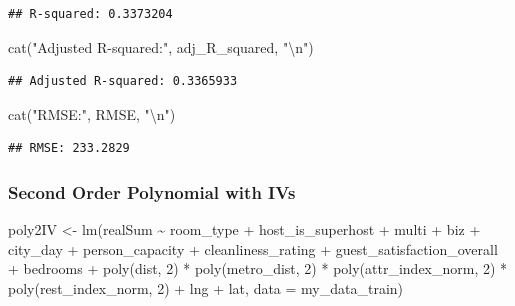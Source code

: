 \documentclass[
]{article}
\newenvironment{Shaded}{\begin{snugshade}}{\end{snugshade}}
\newcommand{\AttributeTok}[1]{\textcolor[rgb]{0.77,0.63,0.00}{#1}}
\newcommand{\DecValTok}[1]{\textcolor[rgb]{0.00,0.00,0.81}{#1}}
\newcommand{\FunctionTok}[1]{\textcolor[rgb]{0.00,0.00,0.00}{#1}}
\newcommand{\NormalTok}[1]{#1}
\newcommand{\OtherTok}[1]{\textcolor[rgb]{0.56,0.35,0.01}{#1}}
\newcommand{\SpecialCharTok}[1]{\textcolor[rgb]{0.00,0.00,0.00}{#1}}
\newcommand{\StringTok}[1]{\textcolor[rgb]{0.31,0.60,0.02}{#1}}
\begin{document}
\begin{verbatim}
## R-squared: 0.3373204
\end{verbatim}

\begin{Shaded}
\begin{Highlighting}[]
\FunctionTok{cat}\NormalTok{(}\StringTok{"Adjusted R{-}squared:"}\NormalTok{, adj\_R\_squared, }\StringTok{"}\SpecialCharTok{\textbackslash{}n}\StringTok{"}\NormalTok{)}
\end{Highlighting}
\end{Shaded}

\begin{verbatim}
## Adjusted R-squared: 0.3365933
\end{verbatim}

\begin{Shaded}
\begin{Highlighting}[]
\FunctionTok{cat}\NormalTok{(}\StringTok{"RMSE:"}\NormalTok{, RMSE, }\StringTok{"}\SpecialCharTok{\textbackslash{}n}\StringTok{"}\NormalTok{)}
\end{Highlighting}
\end{Shaded}

\begin{verbatim}
## RMSE: 233.2829
\end{verbatim}

\hypertarget{second-order-polynomial-with-ivs}{%
\subsubsection{Second Order Polynomial with
IVs}\label{second-order-polynomial-with-ivs}}

\begin{Shaded}
\begin{Highlighting}[]
\NormalTok{poly2IV }\OtherTok{\textless{}{-}} \FunctionTok{lm}\NormalTok{(realSum }\SpecialCharTok{\textasciitilde{}}\NormalTok{ room\_type }\SpecialCharTok{+}\NormalTok{ host\_is\_superhost }\SpecialCharTok{+}\NormalTok{ multi }\SpecialCharTok{+}
\NormalTok{    biz }\SpecialCharTok{+}\NormalTok{ city\_day }\SpecialCharTok{+}\NormalTok{ person\_capacity }\SpecialCharTok{+}\NormalTok{ cleanliness\_rating }\SpecialCharTok{+}\NormalTok{ guest\_satisfaction\_overall }\SpecialCharTok{+}
\NormalTok{    bedrooms }\SpecialCharTok{+} \FunctionTok{poly}\NormalTok{(dist, }\DecValTok{2}\NormalTok{) }\SpecialCharTok{*} \FunctionTok{poly}\NormalTok{(metro\_dist, }\DecValTok{2}\NormalTok{) }\SpecialCharTok{*} \FunctionTok{poly}\NormalTok{(attr\_index\_norm,}
    \DecValTok{2}\NormalTok{) }\SpecialCharTok{*} \FunctionTok{poly}\NormalTok{(rest\_index\_norm, }\DecValTok{2}\NormalTok{) }\SpecialCharTok{+}\NormalTok{ lng }\SpecialCharTok{+}\NormalTok{ lat, }\AttributeTok{data =}\NormalTok{ my\_data\_train)}
\end{Highlighting}
\end{Shaded}
\end{document}
